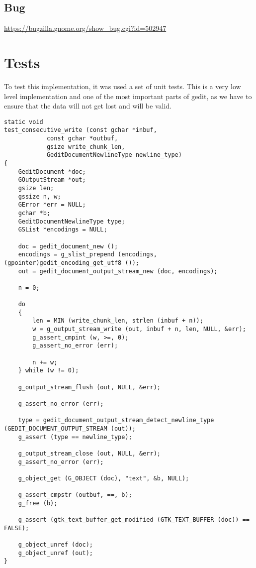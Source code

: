 \subsection{Bug}

\noindent\url{https://bugzilla.gnome.org/show_bug.cgi?id=502947}

\section{Tests}

To test this implementation, it was used a set of unit tests. This is a very low level implementation and one of the most important parts of gedit, as we have to ensure that the data will not get lost and will be valid.

\begin{lstlisting}[style=GObject]
static void
test_consecutive_write (const gchar *inbuf,
			const gchar *outbuf,
			gsize write_chunk_len,
			GeditDocumentNewlineType newline_type)
{
	GeditDocument *doc;
	GOutputStream *out;
	gsize len;
	gssize n, w;
	GError *err = NULL;
	gchar *b;
	GeditDocumentNewlineType type;
	GSList *encodings = NULL;

	doc = gedit_document_new ();
	encodings = g_slist_prepend (encodings, (gpointer)gedit_encoding_get_utf8 ());
	out = gedit_document_output_stream_new (doc, encodings);

	n = 0;

	do
	{
		len = MIN (write_chunk_len, strlen (inbuf + n));
		w = g_output_stream_write (out, inbuf + n, len, NULL, &err);
		g_assert_cmpint (w, >=, 0);
		g_assert_no_error (err);

		n += w;
	} while (w != 0);

	g_output_stream_flush (out, NULL, &err);

	g_assert_no_error (err);

	type = gedit_document_output_stream_detect_newline_type (GEDIT_DOCUMENT_OUTPUT_STREAM (out));
	g_assert (type == newline_type);

	g_output_stream_close (out, NULL, &err);
	g_assert_no_error (err);

	g_object_get (G_OBJECT (doc), "text", &b, NULL);

	g_assert_cmpstr (outbuf, ==, b);
	g_free (b);

	g_assert (gtk_text_buffer_get_modified (GTK_TEXT_BUFFER (doc)) == FALSE);

	g_object_unref (doc);
	g_object_unref (out);
}


\end{lstlisting}
